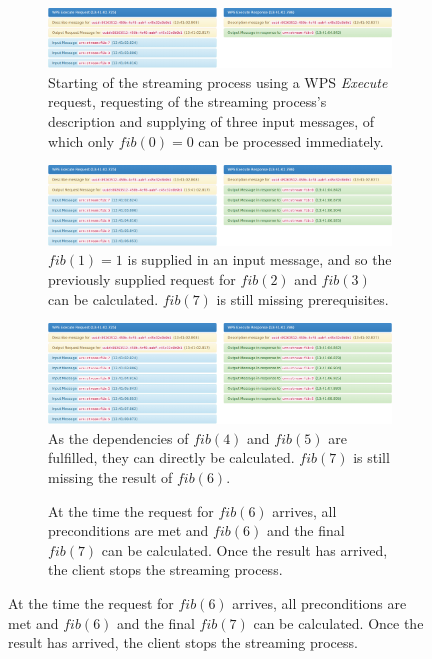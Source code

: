 
\begin{figure}
  \def\fibfigsize{1\linewidth}
  \centering
  \begin{subfigure}{\fibfigsize}
    \caption{Starting of the streaming process using a WPS \emph{Execute} request, requesting of the streaming process's description and supplying of three input messages, of which only $fib(0) = 0$ can be processed immediately.}
    \includegraphics[width = \linewidth]{figures/fibonacci-1.png}
  \end{subfigure}
  \begin{subfigure}{\fibfigsize}
    \caption{$fib(1) = 1$ is supplied in an input message, and so the previously supplied request for $fib(2)$ and $fib(3)$ can be calculated. $fib(7)$ is still missing prerequisites.}
    \includegraphics[width = \linewidth]{figures/fibonacci-2.png}
  \end{subfigure}
  \begin{subfigure}{\fibfigsize}
    \caption{As the dependencies of $fib(4)$ and $fib(5)$ are fulfilled, they can directly be calculated. $fib(7)$ is still missing the result of $fib(6)$.}
    \includegraphics[width = \linewidth]{figures/fibonacci-3.png}
  \end{subfigure}
  \begin{subfigure}{\fibfigsize}
    \caption{At the time the request for $fib(6)$ arrives, all preconditions are met and $fib(6)$ and the final $fib(7)$ can be calculated. Once the result has arrived, the client stops the streaming process.}

\end{subfigure}
\end{figure}

